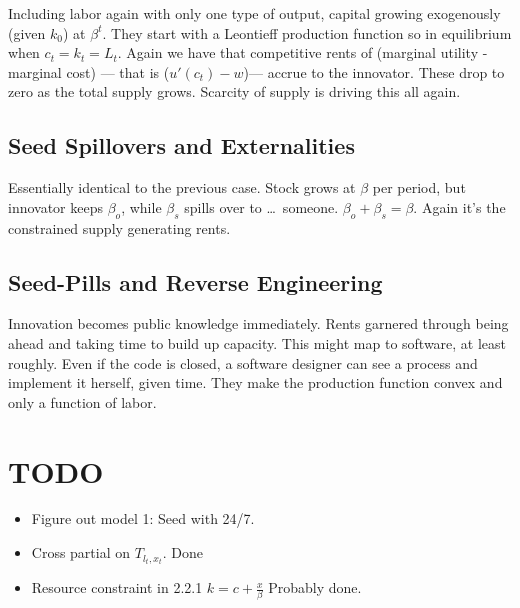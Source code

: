 \documentclass[11pt]{article}
\begin{document}
  Including labor again with only one type of output, capital growing exogenously (given $k_0$) at $\beta^t$.  They start with a Leontieff production function so in equilibrium when $c_t = k_t = L_t$.  Again we have that competitive rents of (marginal utility - marginal cost) --- that is ($u'(c_t) - w$)--- accrue to the innovator.  These drop to zero as the total supply grows.  Scarcity of supply is driving this all again.

\subsection{Seed Spillovers and Externalities}
\label{sub:seed_spillovers_and_externalities}

  Essentially identical to the previous case.  Stock grows at $\beta$ per period, but innovator keeps $\beta_o$, while $\beta_s$ spills over to \ldots\ someone.  $\beta_o + \beta_s = \beta$.  Again it's the constrained supply generating rents.

\subsection{Seed-Pills and Reverse Engineering}
\label{sub:seed_pills_and_reverse_engineering}
  
  Innovation becomes public knowledge immediately.  Rents garnered through being ahead and taking time to build up capacity.  This might map to software, at least roughly.  Even if the code is closed, a software designer can see a process and implement it herself, given time.  They make the production function convex and only a function of labor.

\section{TODO}
\label{sec:todo}

  \begin{itemize}
    \item Figure out model 1: Seed with 24/7.
    \item Cross partial on $T_{l_t,x_t}$. Done
    \item Resource constraint in 2.2.1 $k = c + \frac{x}{\beta}$ Probably done.
  \end{itemize}
  


\label{bib:bibliography}
\end{document}
